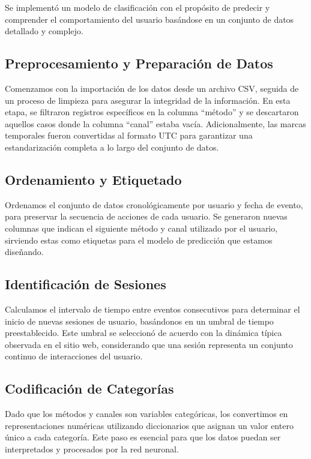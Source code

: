 Se implementó un modelo de clasificación con el propósito de predecir y comprender el comportamiento del usuario basándose en un conjunto de datos detallado y complejo.

\subsection{Preprocesamiento y Preparación de Datos}

Comenzamos con la importación de los datos desde un archivo CSV, seguida de un proceso de limpieza para asegurar la integridad de la información. En esta etapa, se filtraron registros específicos en la columna “método” y se descartaron aquellos casos donde la columna “canal” estaba vacía. Adicionalmente, las marcas temporales fueron convertidas al formato UTC para garantizar una estandarización completa a lo largo del conjunto de datos.

\subsection{Ordenamiento y Etiquetado}

Ordenamos el conjunto de datos cronológicamente por usuario y fecha de evento, para preservar la secuencia de acciones de cada usuario. Se generaron nuevas columnas que indican el siguiente método y canal utilizado por el usuario, sirviendo estas como etiquetas para el modelo de predicción que estamos diseñando.

\subsection{Identificación de Sesiones}

Calculamos el intervalo de tiempo entre eventos consecutivos para determinar el inicio de nuevas sesiones de usuario, basándonos en un umbral de tiempo preestablecido. Este umbral se seleccionó de acuerdo con la dinámica típica observada en el sitio web, considerando que una sesión representa un conjunto continuo de interacciones del usuario.

\subsection{Codificación de Categorías}

Dado que los métodos y canales son variables categóricas, los convertimos en representaciones numéricas utilizando diccionarios que asignan un valor entero único a cada categoría. Este paso es esencial para que los datos puedan ser interpretados y procesados por la red neuronal.

